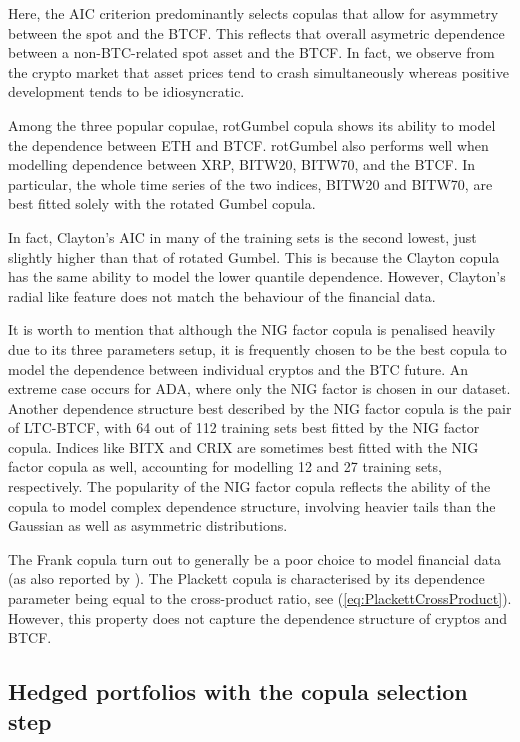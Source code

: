 \documentclass[11pt,a4paper,english]{article}
\begin{document}
Here, the AIC criterion predominantly selects copulas that allow for asymmetry between the spot
and the BTCF.
This reflects that overall asymetric dependence between a non-BTC-related spot asset and
the BTCF.
In fact, we observe from the crypto market that asset prices tend to crash simultaneously whereas positive development
tends to be idiosyncratic.   

Among the three popular copulae, rotGumbel copula shows its ability to
model the dependence between ETH and BTCF. rotGumbel also performs
well when modelling dependence between XRP, BITW20, BITW70, and the
BTCF. In particular, the whole time series of the two indices, BITW20
and BITW70, are best fitted solely with the rotated Gumbel
copula.

In fact, Clayton's AIC in many of the training sets is the second
lowest, just slightly higher than that of rotated Gumbel. This is because the
Clayton copula has the same ability to model the lower quantile
dependence. However, Clayton's radial like feature does not match the
behaviour of the financial data. 

It is worth to mention that although the NIG factor copula is
penalised heavily due to its three parameters setup, it is frequently
chosen to be the best copula to model the dependence between
individual cryptos and the BTC future. An extreme case occurs for ADA,
where only the NIG factor is chosen in our dataset. 
Another dependence structure best described by the NIG factor
copula is the pair of LTC-BTCF, with 64 out of 112 training sets best
fitted by the NIG factor copula. Indices like BITX and CRIX are
sometimes best fitted with the NIG factor copula as well, accounting
for modelling 12 and 27 training sets, respectively. 
The popularity of the NIG factor copula reflects the ability of the
copula to model complex dependence structure, involving heavier tails
than the Gaussian as well as asymmetric distributions.

The Frank copula turn out to generally be a poor choice to model financial
data (as also reported by \cite{barbi2014copula}).
The Plackett copula is characterised by its dependence parameter being
equal to the cross-product ratio, see
(\ref{eq:PlackettCrossProduct}). However, this property
does not capture the dependence structure of cryptos and BTCF.

\subsection{Hedged portfolios with the copula selection step}\label{subsec:HP2}
\end{document}
